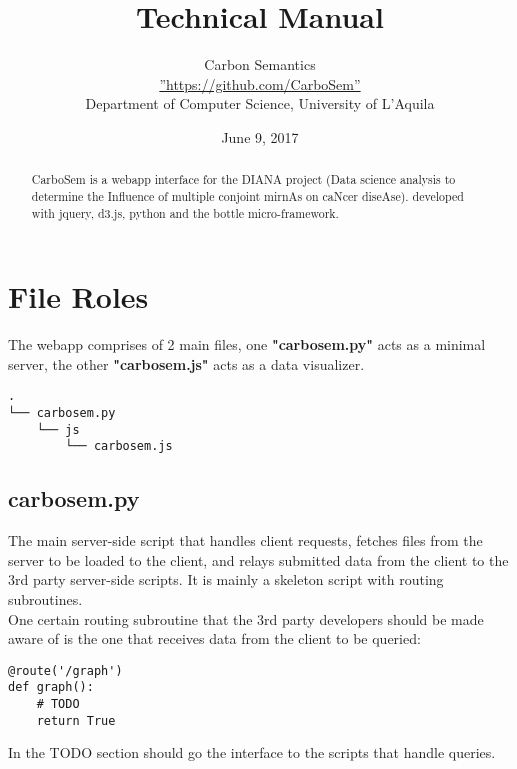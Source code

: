 \documentclass[12pt]{report}
\begin{document}
\title{Technical Manual}
\date{June 9, 2017}
\author{Carbon Semantics\\
	\hyperref[https://github.com/CarboSem]{''https://github.com/CarboSem''}\\ Department of Computer Science, University of L'Aquila}
\maketitle
\begin{abstract}
CarboSem is	a webapp interface for the DIANA project (Data science analysis to determine the Influence of multiple conjoint mirnAs on caNcer diseAse). developed with jquery, d3.js, python and the bottle micro-framework.
\end{abstract}
\newpage
\section{File Roles}
The webapp comprises of 2 main files, one \textbf{"carbosem.py"} acts as a minimal server, the other \textbf{"carbosem.js"} acts as a data visualizer.\\
\begin{lstlisting}[style=tree]
.
└── carbosem.py
	└── js
		└── carbosem.js
\end{lstlisting}
\subsection{carbosem.py}
The main server-side script that handles client requests, fetches files from the server to be loaded to the client, and relays submitted data from the client to the 3rd party server-side scripts. It is mainly a skeleton script with routing subroutines.\\
One certain routing subroutine that the 3rd party developers should be made aware of is the one that receives data from the client to be queried:\\
\begin{lstlisting}[style=python]
@route('/graph')
def graph():
	# TODO
	return True
\end{lstlisting}
In the TODO section should go the interface to the scripts that handle queries.
\newpage
\end{document}
